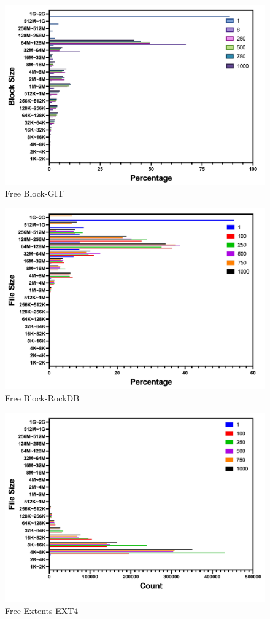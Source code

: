 \begin{figure}[t]
    \centering
	\includegraphics[width=0.95\columnwidth]{graphs/free_block_git}
	\caption{Free Block-GIT}
	\label{f:free_block_git}
\end{figure}

\begin{figure}[t]
    \centering
	\includegraphics[width=0.95\columnwidth]{graphs/free_block_rocksdb}
	\caption{Free Block-RockDB}
	\label{f:free_block_rocksdb}
\end{figure}

\begin{figure}[t]
    \centering
	\includegraphics[width=0.95\columnwidth]{graphs/free_extents_ext4}
	\caption{Free Extents-EXT4}
	\label{f:free_extents_ext4}
\end{figure}

